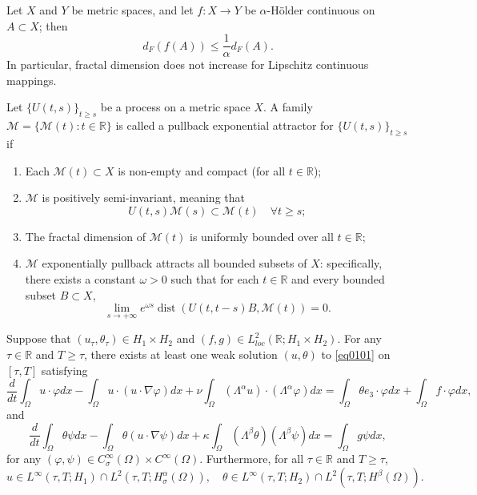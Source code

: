\documentclass[oneside,preprint,12pt,numbers,sort&compress]{elsarticle}
\begin{document}
\begin{lemma}[\cite{MP2002,LY2020,AT2021}]\label{weishuguji}
Let \(X\) and \(Y\) be metric spaces, and let \(f: X \to Y\) be \(\alpha\)-Hölder continuous on \(A \subset X\); then  
\[d_{F}(f(A)) \leq \frac{1}{\alpha} d_{F}(A).\]  
In particular, fractal dimension does not increase for Lipschitz continuous mappings.
\end{lemma}

\begin{definition}\label{lahuizhishudingyi}
Let \(\{U(t,s)\}_{t\geq s}\) be a process on a metric space \(X\). A family \(\mathcal{M} = \{\mathcal{M}(t) : t \in \mathbb{R}\}\) is called a pullback exponential attractor for \(\{U(t,s)\}_{t\geq s}\) if
\begin{enumerate}
\item[(i)] Each \(\mathcal{M}(t) \subset X\) is non-empty and compact (for all \(t \in \mathbb{R}\));
\item[(ii)] \(\mathcal{M}\) is positively semi-invariant, meaning that
\[
U(t,s)\mathcal{M}(s) \subset \mathcal{M}(t) \quad \forall t \geq s;
\]
\item[(iii)] The fractal dimension of \(\mathcal{M}(t)\) is uniformly bounded over all \(t \in \mathbb{R}\);
\item[(iv)] \(\mathcal{M}\) exponentially pullback attracts all bounded subsets of \(X\): specifically, there exists a constant \(\omega > 0\) such that for each \(t \in \mathbb{R}\) and every bounded subset \(B \subset X\),
\[
\lim_{s \to +\infty} e^{\omega s} \operatorname{dist}\left(U(t,t - s)B, \mathcal{M}(t)\right) = 0.\]
\end{enumerate}
\end{definition}


\begin{theorem}
Suppose that $(u_{\tau}, \theta_{\tau})\in H_{1} \times H_{2}$ and $ \left(f, g\right) \in L^2_{loc}(\mathbb{R}; H_{1} \times H_{2})$. For any $\tau\in\mathbb{R}$ and $T\geq \tau$, there exists at least one weak solution $(u,\theta)$ to \cref{eq0101} on $[\tau, T]$ satisfying 
\[
\frac{d}{dt} \int_{\Omega} u \cdot \varphi dx
- \int_{\Omega} u \cdot ( u \cdot \nabla \varphi ) dx
+ \nu \int_{\Omega} ( \Lambda^{\alpha} u ) \cdot ( \Lambda^{\alpha} \varphi ) dx
= \int_{\Omega} \theta e_{3} \cdot \varphi dx
+ \int_{\Omega} f \cdot \varphi dx,
\]
and
\[
\frac{d}{dt} \int_{\Omega} \theta  \psi dx
- \int_{\Omega} \theta ( u \cdot \nabla \psi ) dx
+ \kappa \int_{\Omega} ( \Lambda^{\beta} \theta ) ( \Lambda^{\beta} \psi ) dx
= \int_{\Omega} g \psi dx,
\]
for any $ (\varphi,\psi) \in C_{\sigma}^{\infty} (\Omega) \times C^{\infty}(\Omega) $. Furthermore, for all $\tau\in\mathbb{R}$ and $T\geq\tau$,
\begin{equation*}
u\in L^{\infty}(\tau,T; H_{1})\cap L^{2}(\tau,T; H_\sigma^\alpha(\Omega)),
\quad
\theta\in L^{\infty}(\tau,T; H_{2})\cap L^{2}(\tau,T; H^{\beta}(\Omega)).
\end{equation*}
\end{theorem}
\end{document}

